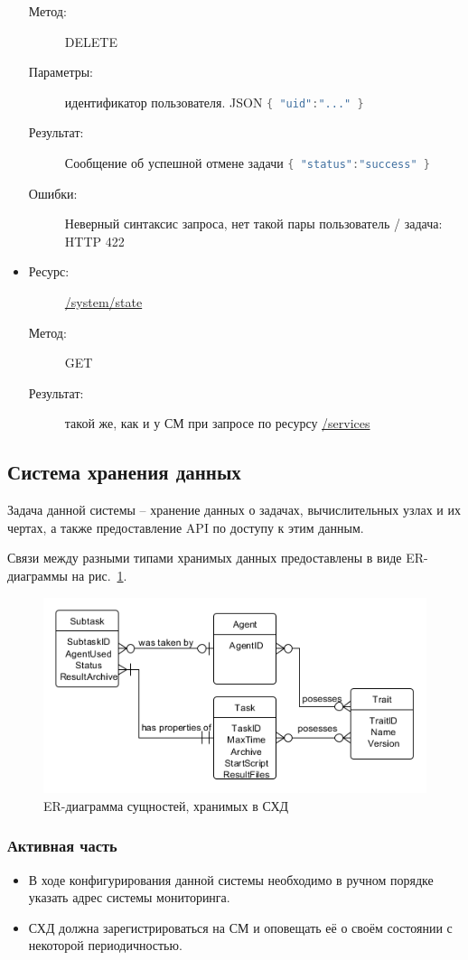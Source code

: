\documentclass[a4paper,12pt]{report}
\numberwithin{equation}{section}
\begin{document}
\begin{itemize}
\begin{description}
      \item[Метод:] DELETE
      \item[Параметры:] идентификатор пользователя. JSON 
      \lstinline[language=Java]|{ "uid":"..." }|
      \item[Результат:] Сообщение об успешной отмене задачи
      \lstinline[language=Java]|{ "status":"success" }|
      \item[Ошибки:] Неверный синтаксис запроса, нет такой пары пользователь / задача: HTTP 422
    \end{description}
    \item
    \begin{description}
      \item[Ресурс:] \url{/system/state}
      \item[Метод:] GET
      \item[Результат:] такой же, как и у СМ при запросе по ресурсу \url{/services}
    \end{description}
  \end{itemize}
  
  \subsection{Система хранения данных}
  Задача данной системы -- хранение данных о задачах, вычислительных узлах и их чертах, а также предоставление API по доступу к этим данным.
  
  Связи между разными типами хранимых данных предоставлены в виде ER-диаграммы на рис.~\ref{fig:db-er}.
  
  \begin{figure}[h!]
    \centering
    \includegraphics[width=.9\linewidth]{diagrams/db/er}
    \caption{ER-диаграмма сущностей, хранимых в СХД}
    \label{fig:db-er}
  \end{figure}
  
  \subsubsection{Активная часть}
  \begin{itemize}
    \item В ходе конфигурирования данной системы необходимо в ручном порядке указать адрес системы мониторинга.
    \item СХД должна зарегистрироваться на СМ и оповещать её о своём состоянии с некоторой периодичностью.
  \end{itemize}
  
\end{document}
